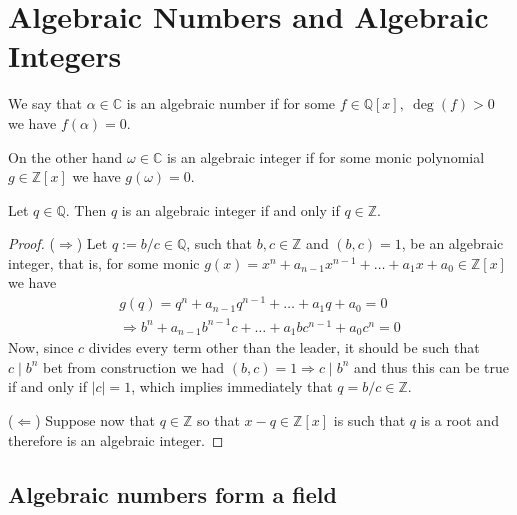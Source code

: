 \section{Algebraic Numbers and Algebraic Integers}

\begin{definition}
    We say that \(\alpha \in \mathbb{C}\) is an algebraic number if for some \(f
    \in \mathbb{Q}[x],\ \deg(f) > 0\) we have \(f(\alpha) = 0\).

    On the other hand \(\omega \in \mathbb{C}\) is an algebraic integer if for
    some monic polynomial \(g \in \mathbb{Z}[x]\) we have \(g(\omega) = 0\).
\end{definition}

\begin{proposition}
    Let \(q \in \mathbb{Q}\). Then \(q\) is an algebraic integer if and only if
    \(q \in \mathbb{Z}\).
\end{proposition}

\begin{proof}
    (\(\Rightarrow\)) Let \(q := b/c \in \mathbb{Q}\), such that \(b, c \in
    \mathbb{Z}\) and \((b, c) = 1\), be an algebraic integer, that is, for some
    monic \(g(x) = x^n + a_{n-1}x^{n-1} + \dots + a_1 x + a_0 \in \mathbb{Z}[x]\)
    we have
    \begin{gather*}
        g(q) = q^n + a_{n-1}q^{n-1} + \dots + a_1 q + a_0 = 0 \\
        \Rightarrow
        b^n + a_{n-1} b^{n-1}c + \dots + a_1 b c^{n-1} + a_0 c^n = 0
    \end{gather*}
    Now, since \(c\) divides every term other than the leader, it should be such
    that \(c \mid b^n\) bet from construction we had \((b, c) = 1 \Rightarrow c
    \mid b^n\) and thus this can be true if and only if \(|c| = 1\), which
    implies immediately that \(q = b/c \in \mathbb{Z}\).

    (\(\Leftarrow\)) Suppose now that \(q \in \mathbb{Z}\) so that \(x - q \in
    \mathbb{Z}[x]\) is such that \(q\) is a root and therefore is an algebraic
    integer.
\end{proof}

\subsection{Algebraic numbers form a field}

